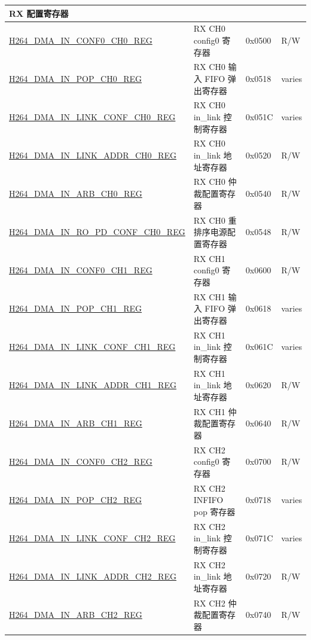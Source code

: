 \begin{longtable}{ | p{7.5cm} | p{5.7cm} | p{1.2cm} | p{1.5cm} | }
\multicolumn{4}{|l|}{\textbf{RX 配置寄存器}} \\ \hline
    \hyperref[regdesc:H264DMAINCONF0CH0REG]{H264\_DMA\_IN\_CONF0\_CH0\_REG} & RX CH0 config0 寄存器 & 0x0500 & R/W \\ \hline
    \hyperref[regdesc:H264DMAINPOPCH0REG]{H264\_DMA\_IN\_POP\_CH0\_REG} & RX CH0 输入 FIFO 弹出寄存器 & 0x0518 & varies \\ \hline
    \hyperref[regdesc:H264DMAINLINKCONFCH0REG]{H264\_DMA\_IN\_LINK\_CONF\_CH0\_REG} & RX CH0 in\_link 控制寄存器 & 0x051C & varies \\ \hline
    \hyperref[regdesc:H264DMAINLINKADDRCH0REG]{H264\_DMA\_IN\_LINK\_ADDR\_CH0\_REG} & RX CH0 in\_link 地址寄存器 & 0x0520 & R/W \\ \hline
    \hyperref[regdesc:H264DMAINARBCH0REG]{H264\_DMA\_IN\_ARB\_CH0\_REG} & RX CH0 仲裁配置寄存器 & 0x0540 & R/W \\ \hline
    \hyperref[regdesc:H264DMAINROPDCONFCH0REG]{H264\_DMA\_IN\_RO\_PD\_CONF\_CH0\_REG} & RX CH0 重排序电源配置寄存器 & 0x0548 & R/W \\ \hline

    \hyperref[regdesc:H264DMAINCONF0CH1REG]{H264\_DMA\_IN\_CONF0\_CH1\_REG} & RX CH1 config0 寄存器 & 0x0600 & R/W \\ \hline
    \hyperref[regdesc:H264DMAINPOPCH1REG]{H264\_DMA\_IN\_POP\_CH1\_REG} & RX CH1 输入 FIFO 弹出寄存器 & 0x0618 & varies \\ \hline
    \hyperref[regdesc:H264DMAINLINKCONFCH1REG]{H264\_DMA\_IN\_LINK\_CONF\_CH1\_REG} & RX CH1 in\_link 控制寄存器 & 0x061C & varies \\ \hline
    \hyperref[regdesc:H264DMAINLINKADDRCH1REG]{H264\_DMA\_IN\_LINK\_ADDR\_CH1\_REG} & RX CH1 in\_link 地址寄存器 & 0x0620 & R/W \\ \hline
    \hyperref[regdesc:H264DMAINARBCH1REG]{H264\_DMA\_IN\_ARB\_CH1\_REG} & RX CH1 仲裁配置寄存器 & 0x0640 & R/W \\ \hline

    \hyperref[regdesc:H264DMAINCONF0CH2REG]{H264\_DMA\_IN\_CONF0\_CH2\_REG} & RX CH2 config0 寄存器 & 0x0700 & R/W \\ \hline
    \hyperref[regdesc:H264DMAINPOPCH2REG]{H264\_DMA\_IN\_POP\_CH2\_REG} & RX CH2 INFIFO pop 寄存器 & 0x0718 & varies \\ \hline
    \hyperref[regdesc:H264DMAINLINKCONFCH2REG]{H264\_DMA\_IN\_LINK\_CONF\_CH2\_REG} & RX CH2 in\_link 控制寄存器 & 0x071C & varies \\ \hline
    \hyperref[regdesc:H264DMAINLINKADDRCH2REG]{H264\_DMA\_IN\_LINK\_ADDR\_CH2\_REG} & RX CH2 in\_link 地址寄存器 & 0x0720 & R/W \\ \hline
    \hyperref[regdesc:H264DMAINARBCH2REG]{H264\_DMA\_IN\_ARB\_CH2\_REG} & RX CH2 仲裁配置寄存器 & 0x0740 & R/W \\ \hline


\end{longtable}
